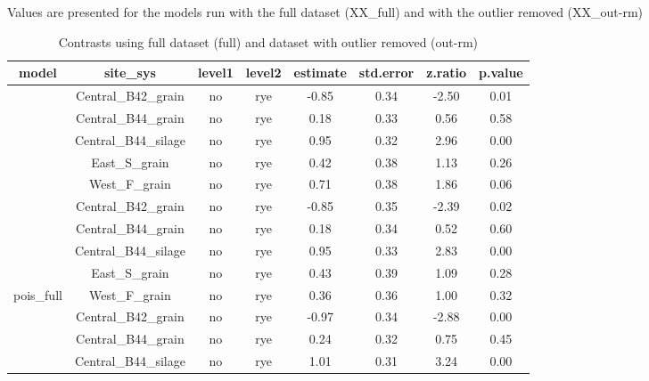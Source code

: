 \documentclass[
]{article}
\begin{document}
Values are presented for the models run with the full dataset (XX\_full)
and with the outlier removed (XX\_out-rm)

\begin{table}[H]

\caption{\label{tab:contrasts}Contrasts using full dataset (full) and dataset with outlier removed (out-rm)}
\centering
\begin{tabular}[t]{cccccccc}
\toprule
model & site\_sys & level1 & level2 & estimate & std.error & z.ratio & p.value\\
\midrule
\rowcolor{gray!6}   & Central\_B42\_grain & no & rye & -0.85 & 0.34 & -2.50 & 0.01\\

 & Central\_B44\_grain & no & rye & 0.18 & 0.33 & 0.56 & 0.58\\

\rowcolor{gray!6}   & Central\_B44\_silage & no & rye & 0.95 & 0.32 & 2.96 & 0.00\\

 & East\_S\_grain & no & rye & 0.42 & 0.38 & 1.13 & 0.26\\

\rowcolor{gray!6}  \multirow{-5}{*}{\centering\arraybackslash pois\_out-rm} & West\_F\_grain & no & rye & 0.71 & 0.38 & 1.86 & 0.06\\
\cmidrule{1-8}
 & Central\_B42\_grain & no & rye & -0.85 & 0.35 & -2.39 & 0.02\\

\rowcolor{gray!6}   & Central\_B44\_grain & no & rye & 0.18 & 0.34 & 0.52 & 0.60\\

 & Central\_B44\_silage & no & rye & 0.95 & 0.33 & 2.83 & 0.00\\

\rowcolor{gray!6}   & East\_S\_grain & no & rye & 0.43 & 0.39 & 1.09 & 0.28\\

\multirow{-5}{*}{\centering\arraybackslash pois\_full} & West\_F\_grain & no & rye & 0.36 & 0.36 & 1.00 & 0.32\\
\cmidrule{1-8}
\rowcolor{gray!6}   & Central\_B42\_grain & no & rye & -0.97 & 0.34 & -2.88 & 0.00\\

 & Central\_B44\_grain & no & rye & 0.24 & 0.32 & 0.75 & 0.45\\

\rowcolor{gray!6}   & Central\_B44\_silage & no & rye & 1.01 & 0.31 & 3.24 & 0.00\\


\end{tabular}
\end{table}
\end{document}
